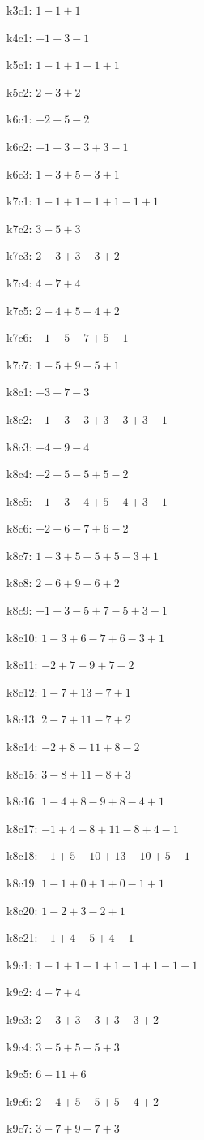 k3c1: $ 1-1+1 $ 

k4c1: $ -1+3-1 $ 

k5c1: $ 1-1+1-1+1 $ 

k5c2: $ 2-3+2 $ 

k6c1: $ -2+5-2 $ 

k6c2: $ -1+3-3+3-1 $ 

k6c3: $ 1-3+5-3+1 $ 

k7c1: $ 1-1+1-1+1-1+1 $ 

k7c2: $ 3-5+3 $ 

k7c3: $ 2-3+3-3+2 $ 

k7c4: $ 4-7+4 $ 

k7c5: $ 2-4+5-4+2 $ 

k7c6: $ -1+5-7+5-1 $ 

k7c7: $ 1-5+9-5+1 $ 

k8c1: $ -3+7-3 $ 

k8c2: $ -1+3-3+3-3+3-1 $ 

k8c3: $ -4+9-4 $ 

k8c4: $ -2+5-5+5-2 $ 

k8c5: $ -1+3-4+5-4+3-1 $ 

k8c6: $ -2+6-7+6-2 $ 

k8c7: $ 1-3+5-5+5-3+1 $ 

k8c8: $ 2-6+9-6+2 $ 

k8c9: $ -1+3-5+7-5+3-1 $ 

k8c10: $ 1-3+6-7+6-3+1 $ 

k8c11: $ -2+7-9+7-2 $ 

k8c12: $ 1-7+13-7+1 $ 

k8c13: $ 2-7+11-7+2 $ 

k8c14: $ -2+8-11+8-2 $ 

k8c15: $ 3-8+11-8+3 $ 

k8c16: $ 1-4+8-9+8-4+1 $ 

k8c17: $ -1+4-8+11-8+4-1 $ 

k8c18: $ -1+5-10+13-10+5-1 $ 

k8c19: $ 1-1+0+1+0-1+1 $ 

k8c20: $ 1-2+3-2+1 $ 

k8c21: $ -1+4-5+4-1 $ 

k9c1: $ 1-1+1-1+1-1+1-1+1 $ 

k9c2: $ 4-7+4 $ 

k9c3: $ 2-3+3-3+3-3+2 $ 

k9c4: $ 3-5+5-5+3 $ 

k9c5: $ 6-11+6 $ 

k9c6: $ 2-4+5-5+5-4+2 $ 

k9c7: $ 3-7+9-7+3 $ 

